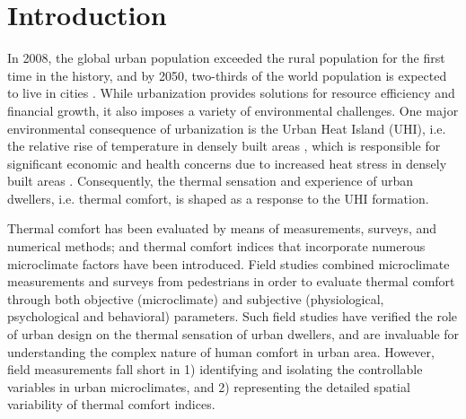 \documentclass[smallextended]{svjour3}
\begin{document}
\section{Introduction}
\label{intro}
In 2008, the global urban population exceeded the rural population for the first time in the history, and by 2050, two-thirds of the world population is expected to live in cities \citep{desa2014world}. While urbanization provides solutions for resource efficiency and financial growth, it also imposes a  variety of environmental challenges. One major environmental consequence of urbanization is the Urban Heat Island (UHI), i.e. the relative rise of temperature in densely built areas \citep{kim1992urban, oke1981canyon, oke1973city, bornstein1968observations}, which is responsible for significant economic and health concerns due to increased heat stress in densely built areas \citep{tan2010urban, lo2003land, mavrogianni2011comfort}. Consequently, the thermal sensation and experience of urban dwellers, i.e. thermal comfort, is shaped as a response to the UHI formation. 

Thermal comfort has been evaluated by means of measurements, surveys, and numerical methods; and thermal comfort indices that incorporate numerous microclimate factors have been introduced. Field studies \citep{chow_assessment_2016,lin_thermal_2009,nikolopoulou2001thermal} combined microclimate measurements and surveys from pedestrians in order to evaluate thermal comfort through both objective (microclimate) and subjective (physiological, psychological and behavioral) parameters. Such field studies have verified the role of urban design on the thermal sensation of urban dwellers, and are invaluable for understanding the complex nature of human comfort in urban area. However, field measurements fall short in 1) identifying and isolating the controllable variables in urban microclimates, and 2) representing the detailed spatial variability of thermal comfort indices. 
\end{document}
